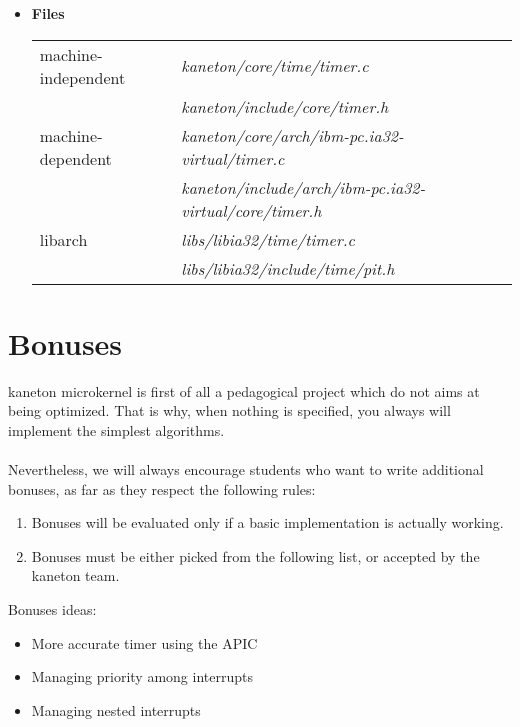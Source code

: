 \begin{itemize}
	 {
	   This function initializes the timer manager.
	 }

	 {
	   This function cleans the timer manager.
	 }
  \item {\bf Files}\\

    \begin{tabular}{| l | l |}
      \hline
      machine-independent & {\em kaneton/core/time/timer.c}\\
      &  {\em kaneton/include/core/timer.h}\\\hline
      machine-dependent & {\em kaneton/core/arch/ibm-pc.ia32-virtual/timer.c}\\
      & {\em kaneton/include/arch/ibm-pc.ia32-virtual/core/timer.h}\\\hline
      libarch & {\em libs/libia32/time/timer.c}\\
      &  {\em libs/libia32/include/time/pit.h}\\\hline
    \end{tabular}

\end{itemize}

%
%

\newpage

\section{Bonuses}

kaneton microkernel is first of all a pedagogical project which do not
aims at being optimized. That is why, when nothing is specified, you
always will implement the simplest algorithms.\\
\\
Nevertheless, we will always encourage students who want to write
additional bonuses, as far as they respect the following rules:

\begin{enumerate}
  \item Bonuses will be evaluated only if a basic implementation is
  actually working.
  \item Bonuses must be either picked from the following list, or
  accepted by the kaneton team.\\
\end{enumerate}

Bonuses ideas:
\begin{itemize}
\item More accurate timer using the APIC
\item Managing priority among interrupts
\item Managing nested interrupts
\end{itemize}
